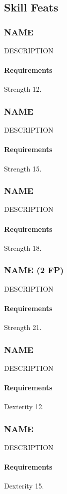\subsection*{Skill Feats}
\subsubsection{NAME} \label{feat::name}
    DESCRIPTION
    \paragraph{Requirements} Strength 12.
\subsubsection{NAME} \label{feat::name}
    DESCRIPTION
    \paragraph{Requirements} Strength 15.
\subsubsection{NAME} \label{feat::name}
    DESCRIPTION
    \paragraph{Requirements} Strength 18.
\subsubsection{NAME (2 FP)} \label{feat::name}
    DESCRIPTION
    \paragraph{Requirements} Strength 21.
\subsubsection{NAME} \label{feat::name}
    DESCRIPTION
    \paragraph{Requirements} Dexterity 12.
\subsubsection{NAME} \label{feat::name}
    DESCRIPTION
    \paragraph{Requirements} Dexterity 15.
